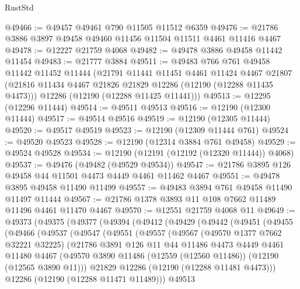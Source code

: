 \begin{lexlean}{RustStd}
\begin{coremodule}
@49466 := @49457 @49461 @790 @11505 @11512 @6359
@49476 := @21786 @3886 @3897 @49458 @49460 @11456 @11504 @11511 @4461 @11416 @4467
@49478 := @12227 @21759 @4068
@49482 := @49478 @3886 @49458 @11442 @11454
@49483 := @21777 @3884
@49511 := @49483
    @766
    @761
    @49458
    @11442
    @11452
    @11444
    (@21791
      @11441
      @11451
      @4461
      @11424
      @4467
      @21807
      (@21816 @11434 @4467 @21826 @21829 @12286 (@12190 (@12288 @11435 @4473)))
      @12286
      (@12190 (@12288 @11425 @11441)))
@49513 := @12295 (@12296 @11444)
@49514 := @49511 @49513
@49516 := @12190 (@12300 @11444)
@49517 := @49514 @49516
@49519 := @12190 (@12305 @11444)
@49520 := @49517 @49519
@49523 := @12190 (@12309 @11444 @761)
@49524 := @49520 @49523
@49528 := @12190 (@12314 @3884 @761 @49458)
@49529 := @49524 @49528
@49534 := @12190 (@12191 (@12192 (@12320 @11444)) @4068)
@49537 := @49476 (@49482 (@49529 @49534))
@49547 := @21786 @3895 @126 @49458 @44 @11501 @4473 @4449 @4461 @11462 @4467
@49551 := @49478 @3895 @49458 @11490 @11499
@49557 := @49483 @3894 @761 @49458 @11490 @11497 @11444
@49567 := @21786 @1378 @3893 @11 @108 @7662 @11489 @11496 @4461 @11470 @4467
@49570 := @12551 @21759 @4068 @11
@49649 := @49373
    (@49375
      (@49377
        (@49394
          (@49412
            (@49429
              (@49442
                (@49451
                  (@49455
                    (@49466
                      (@49537
                        (@49547
                          (@49551
                            (@49557
                              (@49567
                                (@49570 @1377 @7662 @32221 @32225)
                                (@21786
                                  @3891
                                  @126
                                  @11
                                  @44
                                  @11486
                                  @4473
                                  @4449
                                  @4461
                                  @11480
                                  @4467
                                  (@49570
                                    @3890
                                    @11486
                                    (@12559 (@12560 @11486))
                                    (@12190 (@12565 @3890 @11)))
                                  @21829
                                  @12286
                                  (@12190 (@12288 @11481 @4473)))
                                @12286
                                (@12190 (@12288 @11471 @11489)))
                              @49513

\end{coremodule}
\end{lexlean}
